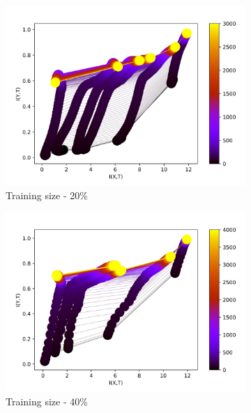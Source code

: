 \documentclass[dissertation.tex]{subfiles}
\begin{document}
\begin{figure}[ht]
  \centering
  \begin{subfigure}[t]{0.32\textwidth}
    \centering
    \includegraphics[width=\textwidth]{figs/eval/trainingSizeRelu/KDE20.png}
    \caption{
      Training size - 20\%
    }
  \end{subfigure}
  \begin{subfigure}[t]{0.32\textwidth}
    \centering
    \includegraphics[width=\textwidth]{figs/eval/trainingSizeRelu/KDE40.png}
    \caption{
      Training size - 40\%
    }
  \end{subfigure}
  \begin{subfigure}[t]{0.32\textwidth}
    \centering

\end{subfigure}
\end{figure}
\end{document}
